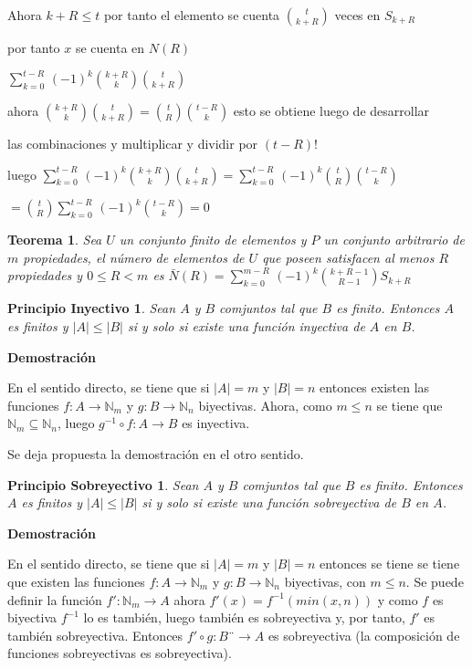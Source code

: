 \documentclass[a4paper,12pt]{report}
\newtheorem*{pin}{Principio Inyectivo}
\newtheorem*{pso}{Principio Sobreyectivo}
\newtheorem*{teo}{Teorema}
\begin{document}
Ahora $k+R\leq t$ por tanto el elemento se cuenta $t\choose{k+R}$ veces en $S_{k+R}$ 

por tanto $x$ se cuenta en $N(R)$
 
$\sum^{t-R}_{k=0}\, (-1)^k$${k+R}\choose{k}$${t}\choose{k+R}$

ahora ${k+R}\choose{k}$${t}\choose{k+R}$$=$${t}\choose{R}$${t-R}\choose{k}$ esto se obtiene luego de desarrollar 

las combinaciones y multiplicar y dividir por $(t-R)!$

luego $\sum^{t-R}_{k=0}\, (-1)^k$${k+R}\choose{k}$${t}\choose{k+R}$$=$$\sum^{t-R}_{k=0}\, (-1)^k$${t}\choose{R}$${t-R}\choose{k}$

$=$${t}\choose{R}$$\sum^{t-R}_{k=0}\, (-1)^k$${t-R}\choose{k}$$=0$

\begin{teo}
  Sea $U$ un conjunto finito de elementos y $P$ un conjunto arbitrario de $m$ propiedades, el número de elementos de $U$ que poseen satisfacen al menos $R$ propiedades y $0\leq R < m$ es
 $\bar{N}(R) = \sum^{m-R}_{k=0}\, (-1)^k$${k+R-1}\choose{R-1}$$S_{k+R}$
\end{teo}

\begin{pin}
 Sean $A$ y $B$ comjuntos tal que $B$ es finito. Entonces $A$ es finitos y $|A|\leq|B|$ si y solo si existe una función inyectiva de $A$ en $B$.
\end{pin}

\textbf{Demostración}

En el sentido directo, se tiene que si $|A|=m$ y $|B|=n$ entonces existen las funciones $f:A\rightarrow\mathbb{N}_m$ y $g:B\rightarrow\mathbb{N}_n$ biyectivas. Ahora, como $m\leq n$ se tiene que $\mathbb{N}_m\subseteq\mathbb{N}_n$, luego $g^{-1}\circ f:A\rightarrow B$ es inyectiva.

Se deja propuesta la demostración en el otro sentido. 

\begin{pso}
 Sean $A$ y $B$ comjuntos tal que $B$ es finito. Entonces $A$ es finitos y $|A|\leq|B|$ si y solo si existe una función sobreyectiva de $B$ en $A$.
\end{pso}

\textbf{Demostración}

En el sentido directo, se tiene que si $|A|=m$ y $|B|=n$ entonces se tiene se tiene que existen las funciones $f:A\rightarrow\mathbb{N}_m$ y $g:B\rightarrow\mathbb{N}_n$ biyectivas, con $m\leq n$. Se puede definir la función $f':\mathbb{N}_m\rightarrow A$ ahora $f'(x)=f^{-1}(min(x,n))$ y como $f$ es biyectiva $f^{-1}$ lo es también, luego también es sobreyectiva y, por tanto, $f'$ es también sobreyectiva. Entonces $f'\circ g:B¨\rightarrow A$ es sobreyectiva (la composición de funciones sobreyectivas es sobreyectiva).
\end{document}
